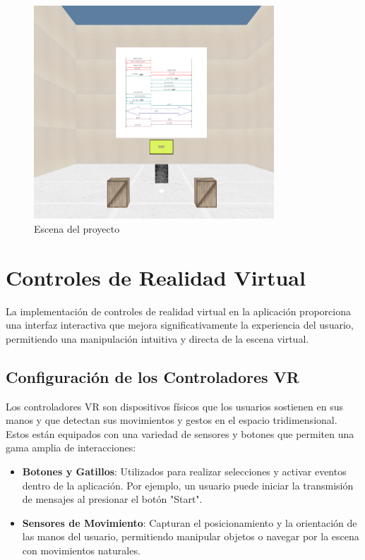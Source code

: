 \documentclass[a4paper, 12pt]{book}
\begin{document}
\begin{figure}
  \centering
  \includegraphics[width=9cm, keepaspectratio]{img/escena.png}
  \caption{Escena del proyecto}
  \label{fig:arquitectura}
\end{figure}


\section{Controles de Realidad Virtual}
\label{sec:controles_vr}

La implementación de controles de realidad virtual en la aplicación proporciona una interfaz interactiva que mejora significativamente la experiencia del usuario, 
permitiendo una manipulación intuitiva y directa de la escena virtual.

\subsection{Configuración de los Controladores VR}
\label{subsec:configuracion_controladores_vr}

Los controladores VR son dispositivos físicos que los usuarios sostienen en sus manos y que detectan sus movimientos y gestos en el espacio tridimensional. 
Estos están equipados con una variedad de sensores y botones que permiten una gama amplia de interacciones:

\begin{itemize}
  \item \textbf{Botones y Gatillos}: Utilizados para realizar selecciones y activar eventos dentro de la aplicación. 
  Por ejemplo, un usuario puede iniciar la transmisión de mensajes al presionar el botón "Start".
  \item \textbf{Sensores de Movimiento}: Capturan el posicionamiento y la orientación de las manos del usuario, 
  permitiendo manipular objetos o navegar por la escena con movimientos naturales.
\end{itemize}
\end{document}
